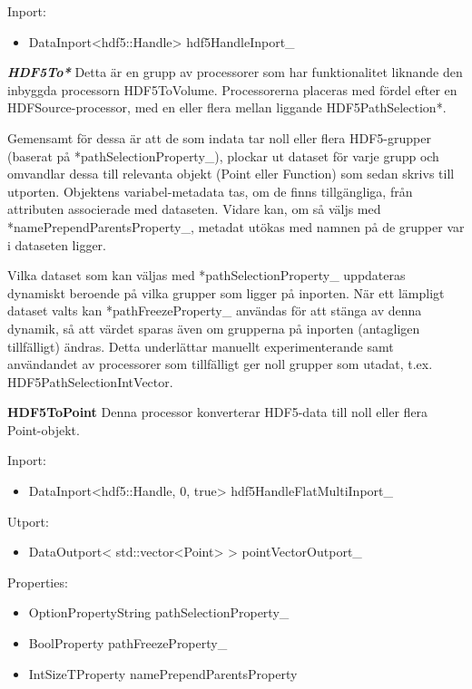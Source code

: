 \documentclass[a4paper,12pt]{article}
\begin{document}
Inport:
\begin{itemize}
\item DataInport<hdf5::Handle> hdf5HandleInport\_
\end{itemize}

\textbf{\textit{HDF5To*}}\newline
Detta är en grupp av processorer som har funktionalitet liknande den inbyggda processorn HDF5ToVolume. Processorerna placeras med fördel efter en HDFSource-processor, med en eller flera mellan liggande HDF5PathSelection*.

Gemensamt för dessa är att de som indata tar noll eller flera HDF5-grupper (baserat på *pathSelectionProperty\_), plockar ut dataset för varje grupp och omvandlar dessa till relevanta objekt (Point eller Function) som sedan skrivs till utporten. Objektens variabel-metadata tas, om de finns tillgängliga, från attributen associerade med dataseten. Vidare kan, om så väljs med *namePrependParentsProperty\_, metadat utökas med namnen på de grupper var i dataseten ligger.

Vilka dataset som kan väljas med *pathSelectionProperty\_ uppdateras dynamiskt beroende på vilka grupper som ligger på inporten. När ett lämpligt dataset valts kan *pathFreezeProperty\_ användas för att stänga av denna dynamik, så att värdet sparas även om grupperna på inporten (antagligen tillfälligt) ändras. Detta underlättar manuellt experimenterande samt användandet av processorer som tillfälligt ger noll grupper som utadat, t.ex. HDF5PathSelectionIntVector.

\textbf{HDF5ToPoint} \newline
Denna processor konverterar HDF5-data till noll eller flera Point-objekt.

Inport:
\begin{itemize}
\item DataInport<hdf5::Handle, 0, true> hdf5HandleFlatMultiInport\_
\end{itemize}

Utport:
\begin{itemize}
\item DataOutport< std::vector<Point> > pointVectorOutport\_
\end{itemize}

Properties:
\begin{itemize}
\item OptionPropertyString pathSelectionProperty\_
\item BoolProperty pathFreezeProperty\_
\item IntSizeTProperty namePrependParentsProperty
\end{itemize}
\end{document}
